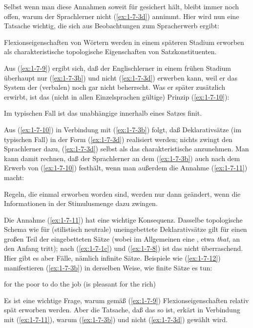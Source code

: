 \documentclass[output=paper]{langsci/langscibook}
\begin{document}
Selbst wenn man diese Annahmen soweit für gesichert hält, bleibt immer
noch offen, warum der Sprachlerner nicht (\ref{ex:1-7-3d})
annimmt. Hier wird nun eine Tatsache wichtig, die sich aus
Beobachtungen zum Spracherwerb ergibt:
\begin{exe}
\ex\label{ex:1-7-9}
Flexionseigenschaften von Wörtern werden in einem späteren Stadium erworben als charakteristische topologische Eigenschaften von Satzkonstituenten.
\end{exe}
Aus (\ref{ex:1-7-9}) ergibt sich, daß der Englischlerner in einem frühen Stadium überhaupt nur
(\ref{ex:1-7-3b}) und nicht (\ref{ex:1-7-3d}) erwerben kann, weil er das System der (verbalen)  noch
gar nicht beherrscht. Was er später zusätzlich erwirbt, ist das (nicht in allen Einzelsprachen gültige) Prinzip (\ref{ex:1-7-10}):
\begin{exe}
\ex\label{ex:1-7-10}
Im typischen Fall ist das unabhängige  innerhalb eines Satzes finit.
\end{exe}
Aus (\ref{ex:1-7-10}) in Verbindung mit (\ref{ex:1-7-3b}) folgt, daß Deklarativsätze (im typischen Fall) in der
Form (\ref{ex:1-7-3d}) realisiert werden; nichts zwingt den Sprachlerner dazu, (\ref{ex:1-7-3d}) selbst als das
charakteristische  anzunehmen. Man kann damit rechnen, daß der Sprachlerner an dem  (\ref{ex:1-7-3b}) auch nach dem Erwerb von (\ref{ex:1-7-10}) festhält, wenn man außerdem die Annahme (\ref{ex:1-7-11}) macht:
\begin{exe}
\ex\label{ex:1-7-11}
Regeln, die einmal erworben worden sind, werden nur dann geändert,
wenn die Informationen in der Stimulusmenge dazu zwingen.
\end{exe}
Die Annahme (\ref{ex:1-7-11}) hat eine wichtige Konsequenz. Dasselbe topologische Sche\-ma wie
für (stilistisch neutrale) uneingebettete Deklarativsätze gilt für einen großen Teil der
eingebetteten Sätze (wobei im Allgemeinen eine , etwa \textit{that}, an den Anfang tritt);
nach (\ref{ex:1-7-1c}) und (\ref{ex:1-7-8}) ist das nicht überraschend. Hier gibt es aber  Fälle,
nämlich infinite Sätze. Beispiele wie (\ref{ex:1-7-12}) manifestieren (\ref{ex:1-7-3b}) in derselben Weise, wie
finite Sätze es tun:
\begin{exe}
\ex\label{ex:1-7-12}
for the poor to do the job (is pleasant for the rich)
\end{exe}
Es ist eine wichtige Frage, warum gemäß (\ref{ex:1-7-9}) Flexionseigenschaften relativ spät erworben werden. Aber die Tatsache, daß das so ist, erkärt in Verbindung mit (\ref{ex:1-7-11}),
warum (\ref{ex:1-7-3b}) und nicht (\ref{ex:1-7-3d}) gewählt wird.
\end{document}
